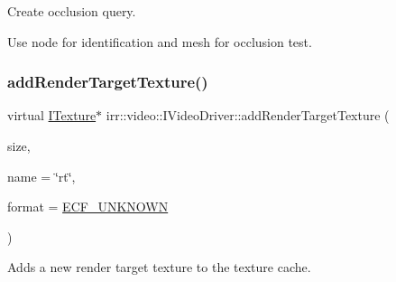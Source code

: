 Create occlusion query. 

Use node for identification and mesh for occlusion test. \mbox{\label{classirr_1_1video_1_1IVideoDriver_aa704cece826ee37d02e4bb054b0b8797}} 
\subsubsection{\texorpdfstring{add\+Render\+Target\+Texture()}{addRenderTargetTexture()}}
{\footnotesize\ttfamily virtual \hyperlink{classirr_1_1video_1_1ITexture}{I\+Texture}$\ast$ irr\+::video\+::\+I\+Video\+Driver\+::add\+Render\+Target\+Texture (\begin{DoxyParamCaption}\item[{const \hyperlink{classirr_1_1core_1_1dimension2d}{core\+::dimension2d}$<$ \hyperlink{namespaceirr_a0416a53257075833e7002efd0a18e804}{u32} $>$ \&}]{size,  }\item[{const \hyperlink{namespaceirr_1_1io_ab1bdc45edb3f94d8319c02bc0f840ee1}{io\+::path} \&}]{name = {\ttfamily \char`\"{}rt\char`\"{}},  }\item[{const \hyperlink{namespaceirr_1_1video_a1d5e487888c32b1674a8f75116d829ed}{E\+C\+O\+L\+O\+R\+\_\+\+F\+O\+R\+M\+AT}}]{format = {\ttfamily \hyperlink{namespaceirr_1_1video_a1d5e487888c32b1674a8f75116d829eda209608685f06c86c6ae489896a246e77}{E\+C\+F\+\_\+\+U\+N\+K\+N\+O\+WN}} }\end{DoxyParamCaption})\hspace{0.3cm}{\ttfamily [pure virtual]}}



Adds a new render target texture to the texture cache. 


